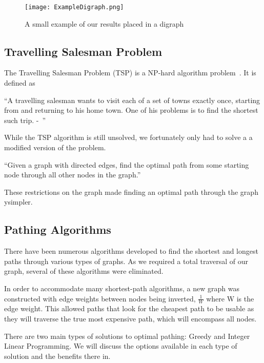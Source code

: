 \documentclass[bsc,frontabs,twoside,singlespacing,parskip,deptreport]{infthesis}     %
\begin{document}
\begin{figure}
  \centering
  \texttt{[image: ExampleDigraph.png]}
  \caption{A small example of our results placed in a digraph}
  \label{fig:digraph}
 \end{figure}

\subsection{Travelling Salesman Problem}
The Travelling Salesman Problem (TSP) is a  NP-hard algorithm problem~\cite{junger1995traveling}.%
It is defined as
\begin{center}
\enquote{A travelling salesman wants to visit each of a set of towns exactly once, starting
from and returning to his home town. One of his problems is to find the shortest
such trip. -~\cite{junger1995traveling}}
\end{center}

While the TSP algorithm is still unsolved, we fortunately only had to solve a a modified version of the problem.\\

\begin{center}
  \enquote{Given a graph with directed edges, find the optimal path from some starting node through all other nodes in
  the graph.}
\end{center}

These restrictions on the graph made finding an optimal path through the graph ysimpler.


\subsection{Pathing Algorithms}
There have been numerous algorithms developed to find the shortest and longest paths through various types of graphs.
As we required a total traversal of our graph, several of these algorithms were eliminated.

In order to accommodate many shortest-path algorithms, a new graph was constructed with edge weights between nodes being inverted,
$\frac{1}{W}$ where W is the edge weight. This allowed paths that look for the cheapest path to be usable as they will traverse the
true most expensive path, which will encompass all nodes.

There are two main types of solutions to optimal pathing: Greedy and Integer Linear Programming.
We will discuss the options available in each type of solution and the benefits there in.
\end{document}
